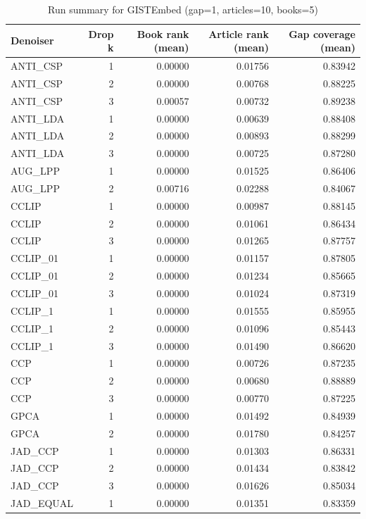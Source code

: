 \begin{table}
\caption{Run summary for GISTEmbed (gap=1, articles=10, books=5)}
\label{tab:summary_gap1_gistembed_a10_b5}
\begin{tabular}{lrrrr}
\toprule
Denoiser & Drop k & Book rank (mean) & Article rank (mean) & Gap coverage (mean) \\
\midrule
ANTI\_CSP & 1 & 0.00000 & 0.01756 & 0.83942 \\
ANTI\_CSP & 2 & 0.00000 & 0.00768 & 0.88225 \\
ANTI\_CSP & 3 & 0.00057 & 0.00732 & 0.89238 \\
\hline
ANTI\_LDA & 1 & 0.00000 & 0.00639 & 0.88408 \\
ANTI\_LDA & 2 & 0.00000 & 0.00893 & 0.88299 \\
ANTI\_LDA & 3 & 0.00000 & 0.00725 & 0.87280 \\
\hline
AUG\_LPP & 1 & 0.00000 & 0.01525 & 0.86406 \\
AUG\_LPP & 2 & 0.00716 & 0.02288 & 0.84067 \\
\hline
CCLIP & 1 & 0.00000 & 0.00987 & 0.88145 \\
CCLIP & 2 & 0.00000 & 0.01061 & 0.86434 \\
CCLIP & 3 & 0.00000 & 0.01265 & 0.87757 \\
\hline
CCLIP\_01 & 1 & 0.00000 & 0.01157 & 0.87805 \\
CCLIP\_01 & 2 & 0.00000 & 0.01234 & 0.85665 \\
CCLIP\_01 & 3 & 0.00000 & 0.01024 & 0.87319 \\
\hline
CCLIP\_1 & 1 & 0.00000 & 0.01555 & 0.85955 \\
CCLIP\_1 & 2 & 0.00000 & 0.01096 & 0.85443 \\
CCLIP\_1 & 3 & 0.00000 & 0.01490 & 0.86620 \\
\hline
CCP & 1 & 0.00000 & 0.00726 & 0.87235 \\
CCP & 2 & 0.00000 & 0.00680 & 0.88889 \\
CCP & 3 & 0.00000 & 0.00770 & 0.87225 \\
\hline
GPCA & 1 & 0.00000 & 0.01492 & 0.84939 \\
GPCA & 2 & 0.00000 & 0.01780 & 0.84257 \\
\hline
JAD\_CCP & 1 & 0.00000 & 0.01303 & 0.86331 \\
JAD\_CCP & 2 & 0.00000 & 0.01434 & 0.83842 \\
JAD\_CCP & 3 & 0.00000 & 0.01626 & 0.85034 \\
\hline
JAD\_EQUAL & 1 & 0.00000 & 0.01351 & 0.83359 \\

\end{tabular}
\end{table}
